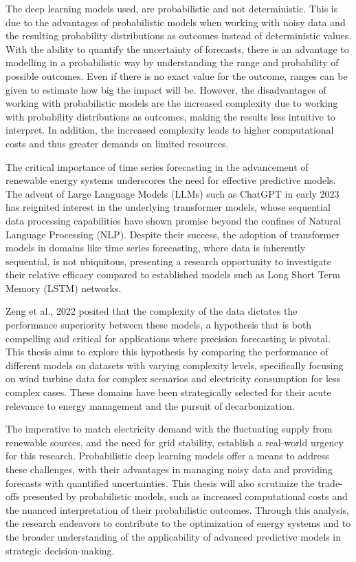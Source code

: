 \documentclass{article}
\begin{document}
The deep learning models used, are probabilistic and not deterministic. This is due to the advantages of probabilistic models when working with noisy data and the resulting probability distributions as outcomes instead of deterministic values. With the ability to quantify the uncertainty of forecasts, there is an advantage to modelling in a probabilistic way by understanding the range and probability of possible outcomes. Even if there is no exact value for the outcome, ranges can be given to estimate how big the impact will be.
However, the disadvantages of working with probabilistic models are the increased complexity due to working with probability distributions as outcomes, making the results less intuitive to interpret. In addition, the increased complexity leads to higher computational costs and thus greater demands on limited resources.


The critical importance of time series forecasting in the advancement of renewable energy systems underscores the need for effective predictive models. The advent of Large Language Models (LLMs) such as ChatGPT in early 2023 has reignited interest in the underlying transformer models, whose sequential data processing capabilities have shown promise beyond the confines of Natural Language Processing (NLP). Despite their success, the adoption of transformer models in domains like time series forecasting, where data is inherently sequential, is not ubiquitous, presenting a research opportunity to investigate their relative efficacy compared to established models such as Long Short Term Memory (LSTM) networks.

Zeng et al., 2022 posited that the complexity of the data dictates the performance superiority between these models, a hypothesis that is both compelling and critical for applications where precision forecasting is pivotal. This thesis aims to explore this hypothesis by comparing the performance of different models on datasets with varying complexity levels, specifically focusing on wind turbine data for complex scenarios and electricity consumption for less complex cases. These domains have been strategically selected for their acute relevance to energy management and the pursuit of decarbonization.

The imperative to match electricity demand with the fluctuating supply from renewable sources, and the need for grid stability, establish a real-world urgency for this research. Probabilistic deep learning models offer a means to address these challenges, with their advantages in managing noisy data and providing forecasts with quantified uncertainties. This thesis will also scrutinize the trade-offs presented by probabilistic models, such as increased computational costs and the nuanced interpretation of their probabilistic outcomes. Through this analysis, the research endeavors to contribute to the optimization of energy systems and to the broader understanding of the applicability of advanced predictive models in strategic decision-making.
\end{document}
